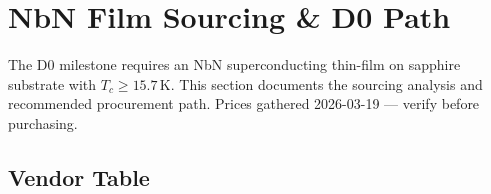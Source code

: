 %
%

\section{NbN Film Sourcing \& D0 Path}
\label{sec:nbn-sourcing}

The D0 milestone requires an NbN superconducting thin-film on sapphire substrate with
$T_c \geq 15.7$\,K. This section documents the sourcing analysis and recommended
procurement path. Prices gathered 2026-03-19 --- verify before purchasing.

\subsection{Vendor Table}
\label{sec:nbn_vendors}

